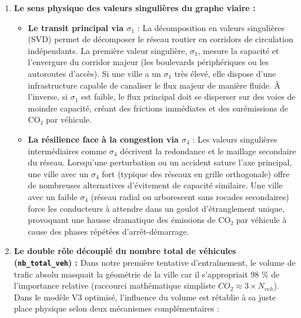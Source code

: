 \documentclass[10pt, a4paper]{article}
\providecommand{\tightlist}{}
\begin{document}
\begin{enumerate}
\def\labelenumi{\arabic{enumi}.}
\tightlist
\item
  \textbf{Le sens physique des valeurs singulières du graphe viaire :}

  \begin{itemize}
  \tightlist
  \item
    \textbf{Le transit principal via \(\sigma_1\)} : La décomposition en
    valeurs singulières (SVD) permet de décomposer le réseau routier en
    corridors de circulation indépendants. La première valeur
    singulière, \(\sigma_1\), mesure la capacité et l'envergure du
    corridor majeur (les boulevards périphériques ou les autoroutes
    d'accès). Si une ville a un \(\sigma_1\) très élevé, elle dispose
    d'une infrastructure capable de canaliser le flux majeur de manière
    fluide. À l'inverse, si \(\sigma_1\) est faible, le flux principal
    doit se disperser sur des voies de moindre capacité, créant des
    frictions immédiates et des surémissions de CO₂ par véhicule.
  \item
    \textbf{La résilience face à la congestion via \(\sigma_4\)} : Les
    valeurs singulières intermédiaires comme \(\sigma_4\) décrivent la
    redondance et le maillage secondaire du réseau. Lorsqu'une
    perturbation ou un accident sature l'axe principal, une ville avec
    un \(\sigma_4\) fort (typique des réseaux en grille orthogonale)
    offre de nombreuses alternatives d'évitement de capacité similaire.
    Une ville avec un faible \(\sigma_4\) (réseau radial ou arborescent
    sans rocades secondaires) force les conducteurs à attendre dans un
    goulot d'étranglement unique, provoquant une hausse dramatique des
    émissions de CO₂ par véhicule à cause des phases répétées
    d'arrêt-démarrage.
  \end{itemize}
\item
  \textbf{Le double rôle découplé du nombre total de véhicules
  (\texttt{nb\_total\_veh}) :} Dans notre première tentative
  d'entraînement, le volume de trafic absolu masquait la géométrie de la
  ville car il s'appropriait 98 \% de l'importance relative (raccourci
  mathématique simpliste \(CO_2 \approx 3 \times N_{veh}\)). Dans le
  modèle V3 optimisé, l'influence du volume est rétablie à sa juste
  place physique selon deux mécanismes complémentaires :


\end{enumerate}
\end{document}

